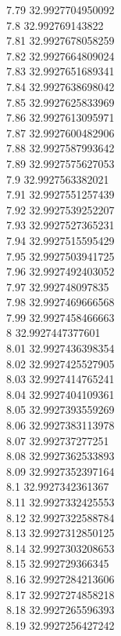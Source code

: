 {7.79	32.9927704950092\\
7.8	32.992769143822\\
7.81	32.9927678058259\\
7.82	32.9927664809024\\
7.83	32.9927651689341\\
7.84	32.9927638698042\\
7.85	32.9927625833969\\
7.86	32.9927613095971\\
7.87	32.9927600482906\\
7.88	32.9927587993642\\
7.89	32.9927575627053\\
7.9	32.9927563382021\\
7.91	32.9927551257439\\
7.92	32.9927539252207\\
7.93	32.9927527365231\\
7.94	32.9927515595429\\
7.95	32.9927503941725\\
7.96	32.9927492403052\\
7.97	32.992748097835\\
7.98	32.9927469666568\\
7.99	32.9927458466663\\
8	32.9927447377601\\
8.01	32.9927436398354\\
8.02	32.9927425527905\\
8.03	32.9927414765241\\
8.04	32.9927404109361\\
8.05	32.9927393559269\\
8.06	32.9927383113978\\
8.07	32.992737277251\\
8.08	32.9927362533893\\
8.09	32.9927352397164\\
8.1	32.9927342361367\\
8.11	32.9927332425553\\
8.12	32.9927322588784\\
8.13	32.9927312850125\\
8.14	32.9927303208653\\
8.15	32.992729366345\\
8.16	32.9927284213606\\
8.17	32.9927274858218\\
8.18	32.9927265596393\\
8.19	32.9927256427242\\
}
